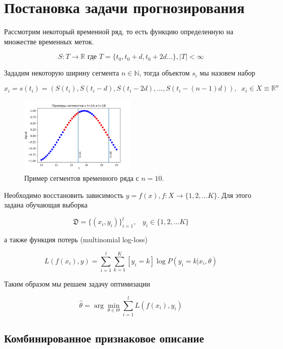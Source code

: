 \documentclass[12pt,fleqn,unicode]{article}
\newcommand{\R}{\mathbb{R}}
\newcommand{\N}{\mathbb{N}}
\begin{document}
\newpage
\section{Постановка задачи прогнозирования}

Рассмотрим некоторый временной ряд, то есть функцию определенную на множестве
временных меток.

$$
S: T \to \R \text{ где } T = \{t_0, t_0 + d, t_0 + 2d \ldots\}, |T| < \infty
$$

Зададим некоторую ширину сегмента $n \in \N$, тогда объектом $s_i$ мы
назовем набор

$$
x_i = s(t_i) = (S(t_i), S(t_i - d), S(t_i - 2d), \ldots, S(t_i - (n - 1)d)),
\;\; x_i \in X \equiv \R^n
$$

\begin{figure}[ht]
    \caption{Пример сегментов временного ряда с $n=10$.}
    \centering
      \includegraphics[width=0.5\textwidth]{../pics/segment_def.png}
\end{figure}

Необходимо восстановить зависимость $y = f(x), f: X \to \{1, 2, \ldots K\}$.
Для этого задана обучающая выборка

$$
\mathfrak{D} = \{ (x_i, y_i) \}_{i=1}^l, \;\;\; y_i \in \{1, 2, \ldots K\}
$$

а также функция потерь (multinomial log-loss)

\begin{equation} \label{init_logloss}
L(f(x_i), y) = \sum_{i=1}^l\sum_{k=1}^K [y_i = k]\log P(y_i = k| x_i, \theta)
\end{equation}

Таким образом мы решаем задачу оптимизации

$$
\hat{\theta} = \arg\min_{\theta \in \Theta} \sum_{i = 1}^l L(f(x_i), y_i)
$$

\subsection{Комбинированное признаковое описание}
\end{document}
